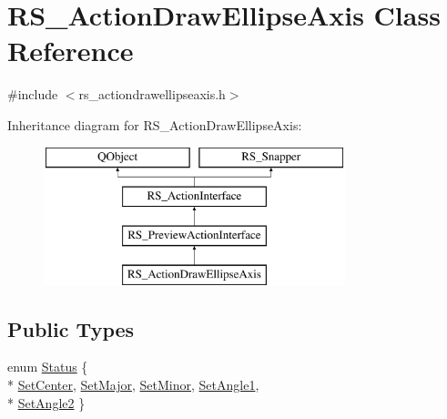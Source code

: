 \hypertarget{classRS__ActionDrawEllipseAxis}{\section{R\-S\-\_\-\-Action\-Draw\-Ellipse\-Axis Class Reference}
\label{classRS__ActionDrawEllipseAxis}
}


{\ttfamily \#include $<$rs\-\_\-actiondrawellipseaxis.\-h$>$}

Inheritance diagram for R\-S\-\_\-\-Action\-Draw\-Ellipse\-Axis\-:\begin{figure}[H]
\begin{center}
\leavevmode
\includegraphics[height=4.000000cm]{classRS__ActionDrawEllipseAxis}
\end{center}
\end{figure}
\subsection*{Public Types}
\begin{DoxyCompactItemize}
\item 
enum \hyperlink{classRS__ActionDrawEllipseAxis_a54be2d78c868f94327e671fee6690604}{Status} \{ \\*
\hyperlink{classRS__ActionDrawEllipseAxis_a54be2d78c868f94327e671fee6690604a1f67dbe82711df44c375083c4d1e2d91}{Set\-Center}, 
\hyperlink{classRS__ActionDrawEllipseAxis_a54be2d78c868f94327e671fee6690604a8f081e27f8e352afa35c9adc651adf88}{Set\-Major}, 
\hyperlink{classRS__ActionDrawEllipseAxis_a54be2d78c868f94327e671fee6690604a6c91967a4272459e5b4b5ab7baead1e2}{Set\-Minor}, 
\hyperlink{classRS__ActionDrawEllipseAxis_a54be2d78c868f94327e671fee6690604a2424448c561eac0fd64b0abd7f83cb7e}{Set\-Angle1}, 
\\*
\hyperlink{classRS__ActionDrawEllipseAxis_a54be2d78c868f94327e671fee6690604adf503e2a1cb6c730744cf3563d5847de}{Set\-Angle2}
 \}
\end{DoxyCompactItemize}
